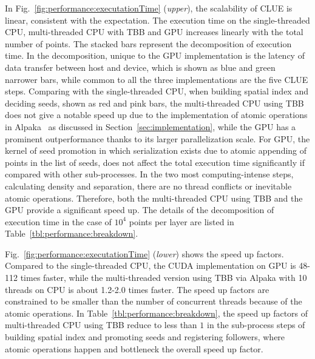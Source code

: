 In Fig.~\ref{fig:performance:executationTime} (\emph{upper}), the scalability of CLUE is linear, consistent with the expectation. The execution time on the single-threaded CPU, multi-threaded CPU with TBB and GPU increases linearly with the total number of points. The stacked bars represent the decomposition of execution time. In the decomposition, unique to the GPU implementation is the latency of data transfer between host and device, which is shown as blue and green narrower bars, while common to all the three implementations are the five CLUE steps. Comparing with the single-threaded CPU, when building spatial index and deciding seeds, shown as red and pink bars, the multi-threaded CPU using TBB does not give a notable speed up due to the implementation of atomic operations in Alpaka~\cite{zenker2016alpaka} as discussed in Section~\ref{sec:implementation}, while the GPU has a prominent outperformance thanks to its larger parallelization scale. For GPU, the kernel of seed promotion in which serialization exists due to atomic appending of points in the list of seeds, does not affect the total execution time significantly if compared with other sub-processes. In the two most computing-intense steps, calculating density and separation, there are no thread conflicts or inevitable atomic operations. Therefore, both the multi-threaded CPU using TBB and the GPU provide a significant speed up. The details of the decomposition of execution time in the case of $10^4$ points per layer are listed in Table~\ref{tbl:performance:breakdown}. 

Fig.~\ref{fig:performance:executationTime} (\emph{lower}) shows the speed up factors. Compared to the single-threaded CPU, the CUDA implementation on GPU is 48-112 times faster, while the multi-threaded version using TBB via Alpaka with 10 threads on CPU is about 1.2-2.0 times faster. The speed up factors are constrained to be smaller than the number of concurrent threads because of the atomic operations. In Table~\ref{tbl:performance:breakdown}, the speed up factors of multi-threaded CPU using TBB reduce to less than $1$ in the sub-process steps of building spatial index and promoting seeds and registering followers, where atomic operations happen and bottleneck the overall speed up factor.
